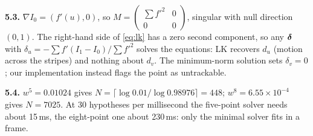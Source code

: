 \textbf{5.3.} $\nabla I_0=(f'(u),0)$, so $M=\begin{pmatrix}\sum f'^2&0
\\0&0\end{pmatrix}$, singular with null direction $(0,1)$. The
right-hand side of \eqref{eq:lk} has a zero second component, so any
$\bm{\delta}$ with $\delta_u=-\sum f'(I_1-I_0)/\sum f'^2$ solves the
equations: LK recovers $d_u$ (motion across the stripes) and nothing
about $d_v$. The minimum-norm solution sets $\delta_v=0$; our
implementation instead flags the point as untrackable.

\textbf{5.4.} $w^5=0.01024$ gives $N=\lceil\log0.01/\log0.98976\rceil=
448$; $w^8=6.55\times10^{-4}$ gives $N=7025$. At 30 hypotheses per
millisecond the five-point solver needs about 15\,ms, the eight-point
one about 230\,ms: only the minimal solver fits in a frame.
